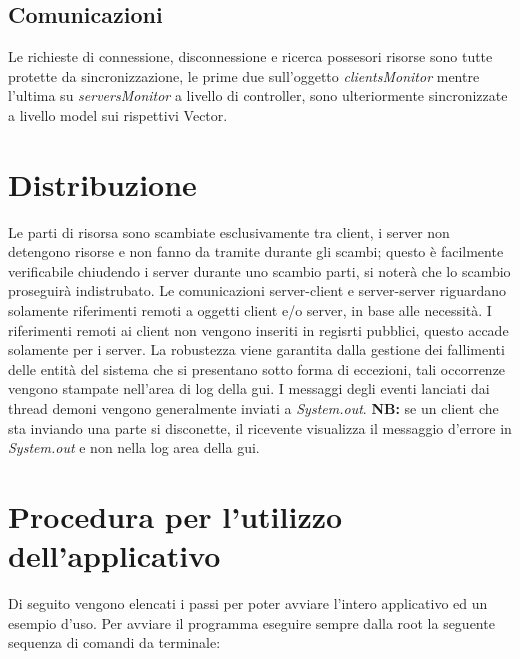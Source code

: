 \documentclass[
10pt, %
a4paper, %
oneside, %
BCOR5mm, %
]{scrartcl}
\begin{document}
	\subsection{Comunicazioni}
	Le richieste di connessione, disconnessione e ricerca possesori risorse sono tutte protette da sincronizzazione, le prime due sull'oggetto \textit{clientsMonitor} mentre l'ultima su \textit{serversMonitor} a livello di controller, sono ulteriormente sincronizzate a livello model sui rispettivi Vector.


\section{Distribuzione}

	Le parti di risorsa sono scambiate esclusivamente tra client, i server non detengono risorse e non fanno da tramite durante gli scambi; questo è facilmente verificabile chiudendo i server durante uno scambio parti, si noterà che lo scambio proseguirà indistrubato. Le comunicazioni server-client e server-server riguardano solamente riferimenti remoti a oggetti client e/o server, in base alle necessità.
	I riferimenti remoti ai client non vengono inseriti in regisrti pubblici, questo accade solamente per i server.
	La robustezza viene garantita dalla gestione dei fallimenti delle entità del sistema che si presentano sotto forma di eccezioni, tali occorrenze vengono stampate nell'area di log della gui. I messaggi degli eventi lanciati dai thread demoni vengono generalmente inviati a \emph{System.out}. \textbf{NB:} se un client che sta inviando una parte si disconette, il ricevente visualizza il messaggio d'errore in \emph{System.out} e non nella log area della gui.


\section{Procedura per l'utilizzo dell'applicativo}
	
	Di seguito vengono elencati i passi per poter avviare l'intero applicativo ed un esempio d'uso. 
	Per avviare il programma eseguire sempre dalla root la seguente sequenza di comandi da terminale:
\end{document}
